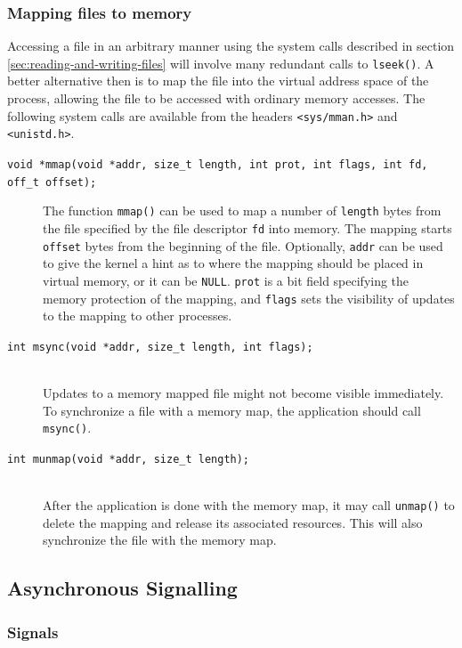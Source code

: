 \subsubsection{Mapping files to memory}\label{mapping-files-to-memory}
Accessing a file in an arbitrary manner using the system calls described in section \ref{sec:reading-and-writing-files} will involve many redundant calls to \texttt{lseek()}. A better alternative then is to map the file into the virtual address space of the process, allowing the file to be accessed with ordinary memory accesses. The following system calls are available from the headers \texttt{<sys/mman.h>} and \texttt{<unistd.h>}.

\begin{description}
\item[\texttt{void *mmap(void *addr, size\_t length, int prot, int flags, int fd, off\_t offset);}]
The function \texttt{mmap()} can be used to map a number of \texttt{length} bytes from the file specified by the file descriptor \texttt{fd} into memory. The mapping starts \texttt{offset} bytes from the beginning of the file. Optionally, \texttt{addr} can be used to give the kernel a hint as to where the mapping should be placed in virtual memory, or it can be \texttt{NULL}. \texttt{prot} is a bit field specifying the memory protection of the mapping, and \texttt{flags} sets the visibility of updates to the mapping to other processes.
\item[\texttt{int msync(void *addr, size\_t length, int flags);}] \hfill \\
Updates to a memory mapped file might not become visible immediately. To synchronize a file with a memory map, the application should call \texttt{msync()}.
\item[\texttt{int munmap(void *addr, size\_t length);}] \hfill \\
After the application is done with the memory map, it may call \texttt{unmap()} to delete the mapping and release its associated resources. This will also synchronize the file with the memory map.
\end{description}


\subsection{Asynchronous Signalling}\label{sec:asynchronous-signalling}

\subsubsection{Signals}



